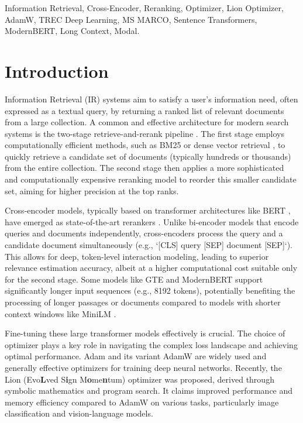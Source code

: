 \documentclass[conference]{IEEEtran}
\begin{document}
\begin{IEEEkeywords}
Information Retrieval, Cross-Encoder, Reranking, Optimizer, Lion Optimizer, AdamW, TREC Deep Learning, MS MARCO, Sentence Transformers, ModernBERT, Long Context, Modal.
\end{IEEEkeywords}

\section{Introduction}
Information Retrieval (IR) systems aim to satisfy a user's information need, often expressed as a textual query, by returning a ranked list of relevant documents from a large collection. A common and effective architecture for modern search systems is the two-stage retrieve-and-rerank pipeline \cite{Lin2021PretrainedTF}. The first stage employs computationally efficient methods, such as BM25 \cite{robertson2009probabilistic} or dense vector retrieval \cite{karpukhin2020dense}, to quickly retrieve a candidate set of documents (typically hundreds or thousands) from the entire collection. The second stage then applies a more sophisticated and computationally expensive reranking model to reorder this smaller candidate set, aiming for higher precision at the top ranks.

Cross-encoder models, typically based on transformer architectures like BERT \cite{devlin2019bert}, have emerged as state-of-the-art rerankers \cite{nogueira2019passage, Nogueira2020Document}. Unlike bi-encoder models that encode queries and documents independently, cross-encoders process the query and a candidate document simultaneously (e.g., `[CLS] query [SEP] document [SEP]`). This allows for deep, token-level interaction modeling, leading to superior relevance estimation accuracy, albeit at a higher computational cost suitable only for the second stage. Some models like GTE \cite{li2023towards} and ModernBERT \cite{modernbert} support significantly longer input sequences (e.g., 8192 tokens), potentially benefiting the processing of longer passages or documents compared to models with shorter context windows like MiniLM \cite{wang2020minilm}.

Fine-tuning these large transformer models effectively is crucial. The choice of optimizer plays a key role in navigating the complex loss landscape and achieving optimal performance. Adam \cite{kingma2014adam} and its variant AdamW \cite{loshchilov2019decoupled} are widely used and generally effective optimizers for training deep neural networks. Recently, the Lion (Evo\textbf{L}ved S\textbf{i}gn M\textbf{o}me\textbf{n}tum) optimizer \cite{chen2023symbolic} was proposed, derived through symbolic mathematics and program search. It claims improved performance and memory efficiency compared to AdamW on various tasks, particularly image classification and vision-language models.
\end{document}
